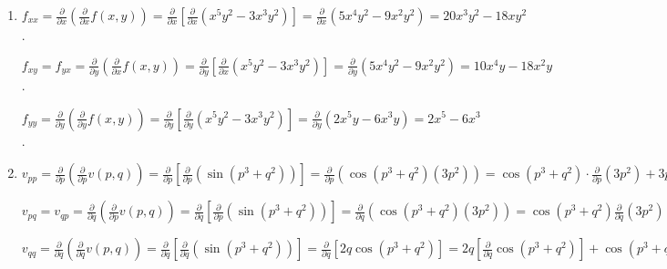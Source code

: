 \begin{Answer}[ref = second]
\begin{enumerate}
\item $f_{xx} = \frac{\partial}{\partial x} \left( \frac{\partial}{\partial x}
f(x, y) \right) = \frac{\partial}{\partial x} \left[ \frac{\partial}{\partial 
x} \left( x^5y^2 - 3x^3y^2 \right) \right] = \frac{\partial}{\partial x} \left(
5x^4y^2 - 9x^2y^2 \right) = 20x^3y^2 - 18xy^2$. 

$f_{xy} = f_{yx} = \frac{\partial}{\partial y} \left( \frac{\partial}{\partial 
x}f(x, y) \right) = \frac{\partial}{\partial y} \left[ \frac{\partial}{\partial
x} \left( x^5y^2 - 3x^3y^2 \right) \right] = \frac{\partial}{\partial y} \left(
5x^4y^2 - 9x^2y^2 \right) = 10x^4y - 18x^2y$. 

$f_{yy} = \frac{\partial}{\partial y} \left( \frac{\partial}{\partial y} 
f(x, y) \right) = \frac{\partial}{\partial y} \left[ \frac{\partial}{\partial 
y} \left( x^5y^2 - 3x^3y^2 \right) \right] = \frac{\partial}{\partial y} \left(
2x^5y - 6x^3y \right) = 2x^5 - 6x^3$. 

\item $v_{pp} = \frac{\partial}{\partial p} \left( \frac{\partial}{\partial p}
v(p, q) \right) = \frac{\partial}{\partial p} \left[ \frac{\partial}{\partial 
p} \left( \sin{ \left(p^3 + q^2 \right)} \right) \right] = \frac{\partial}{
\partial p} \left( \cos{ \left( p^3 + q^2 \right)} \left( 3p^2 \right) \right) 
= \cos{ \left(p^3 + q^2 \right)} \cdot \frac{\partial}{\partial p} \left( 3p^2 
\right) + 3p^2 \cdot \frac{\partial}{\partial p} \left(\cos{ \left(p^3 + q^2 
\right)} \right)$

$v_{pq} = v_{qp} = \frac{\partial}{\partial q} \left( \frac{\partial}{\partial 
p} v(p, q) \right) = \frac{\partial}{\partial q} \left[ \frac{\partial}{
\partial p} \left( \sin{ \left(p^3 + q^2 \right)} \right) \right] = \frac{
\partial}{\partial q} \left( \cos{ \left( p^3 + q^2 \right)} \left( 3p^2 
\right) \right) = \cos{ \left( p^3 + q^2 \right)} \frac{\partial}{\partial q} 
\left( 3p^2 \right) + 3p^2 \frac{\partial}{\partial q} \cos{ \left( p^3 + q^2 
\right)} = 0 + 3p^2 \left(-\sin{ \left( p^3 + q^2 \right)} \right) \left( 
\frac{\partial}{\partial q} \left(p^3 + q^2 \right) \right) = -6 p^2 q \sin{ 
\left(p^3 + q^2 \right)}$

$v_{qq} = \frac{\partial}{\partial q} \left( \frac{\partial}{\partial q}v(p, q)
\right) = \frac{\partial}{\partial q} \left[ \frac{\partial}{\partial q} \left(
\sin{\left( p^3 + q^2 \right)} \right) \right] = \frac{\partial}{\partial q} 
\left[ 2q\cos{ \left(p^3 + q^2 \right)} \right] = 2q \left[ \frac{\partial}{
\partial q} \cos{ \left(p^3 + q^2 \right)} \right] + \cos{ \left( p^3 + q^2 
\right)} \left[ \frac{\partial}{\partial q} \left( 2q \right) \right] = \left( 
2q \right) \cdot \left[ -2q \sin{ \left(p^3 + q^2 \right)} \right] + 2\cos{ 
\left(p^3 + q^2 \right)} = 2\cos{ \left(p^3 + q^2 \right)} - 4q^2 \sin{ \left(
p^3 + q^2 \right)}$


\end{enumerate}
\end{Answer}
